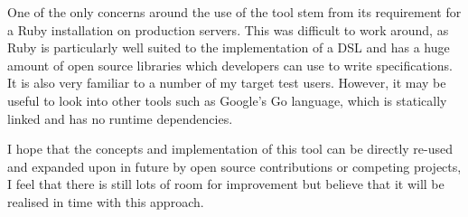 \documentclass{cshonours}
\begin{document}
One of the only concerns around the use of the tool stem from its requirement for a Ruby installation on production servers. This was difficult to work around, as Ruby is particularly well suited to the implementation of a DSL and has a huge amount of open source libraries which developers can use to write specifications. It is also very familiar to a number of my target test users. However, it may be useful to look into other tools such as Google's Go language, which is statically linked and has no runtime dependencies.

I hope that the concepts and implementation of this tool can be directly re-used and expanded upon in future by open source contributions or competing projects, I feel that there is still lots of room for improvement but believe that it will be realised in time with this approach.


\printbibliography[title=References]
% 
\end{document}
